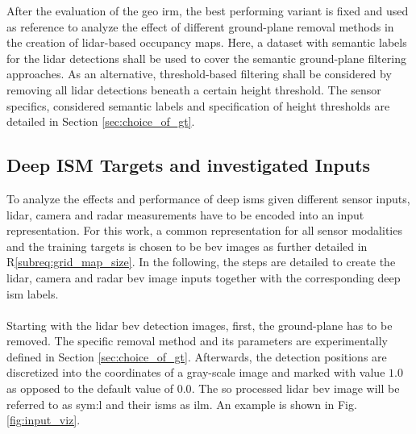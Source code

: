 After the evaluation of the geo \gls{irm}, the best performing variant is fixed and used as reference to analyze the effect of different ground-plane removal methods in the creation of lidar-based occupancy maps. Here, a dataset with semantic labels for the lidar detections shall be used to cover the semantic ground-plane filtering approaches. As an alternative, threshold-based filtering shall be considered by removing all lidar detections beneath a certain height threshold. The sensor specifics, considered semantic labels and specification of height thresholds are detailed in Section \ref{sec:choice_of_gt}. 
%
\subsection{Deep ISM Targets and investigated Inputs}
\label{subsec:def_of_targets_n_inputs}
To analyze the effects and performance of deep \gls{ism}s given different sensor inputs, lidar, camera and radar measurements have to be encoded into an input representation. For this work, a common representation for all sensor modalities and the training targets is chosen to be \gls{bev} images as further detailed in R\ref{subreq:grid_map_size}. In the following, the steps are detailed to create the lidar, camera and radar \gls{bev} image inputs together with the corresponding deep \gls{ism} labels. 
\\\\
Starting with the lidar \gls{bev} detection images, first, the ground-plane has to be removed. The specific removal method and its parameters are experimentally defined in Section \ref{sec:choice_of_gt}. Afterwards, the detection positions are discretized into the coordinates of a gray-scale image and marked with value $1.0$ as opposed to the default value of $0.0$. The so processed lidar \gls{bev} image will be referred to as \gls{sym:l} and their \gls{ism}s as \gls{ilm}. An example is shown in Fig. \ref{fig:input_viz}.
\\\\
